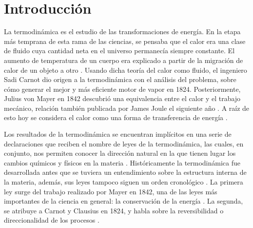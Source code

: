 
%


\newcommand{\keyword}[1]{\textit{#1}}


\chapter{Introducción}
	La termodinámica es el estudio de las transformaciones de energía. En la etapa más temprana de esta rama de las ciencias, se pensaba que el calor era una clase de fluido cuya cantidad neta en el universo permanecía siempre constante. El aumento de temperatura de un cuerpo era explicado a partir de la migración de calor de un objeto a otro \cite{feynman2011feynman, fermi1986}. Usando dicha teoría del calor como fluido, el ingeniero Sadi Carnot dio origen a la termodinámica con el análisis del problema, sobre cómo generar el mejor y más eficiente motor de vapor en 1824. Posteriormente, Julius von Mayer en 1842 descubrió una equivalencia entre el calor y el trabajo mecánico, relaci\'on también publicada por James Joule el siguiente año \cite{fermi1986}. A raíz de esto hoy se considera el calor como una forma de transferencia de energía \cite{fermi1986}.
	
	Los resultados de la termodinámica se encuentran implícitos en una serie de declaraciones que reciben el nombre de leyes de la termodinámica, las cuales, en conjunto, nos permiten conocer la dirección natural en la que tienen lugar los cambios químicos y físicos en la materia \cite{atkins2011physical}. Históricamente la termodinámica fue desarrollada antes que se tuviera un entendimiento sobre la estructura interna de la materia, además, sus leyes tampoco siguen un orden cronológico \cite{feynman2011feynman}. La primera ley surge del trabajo realizado por Mayer en 1842, una de las leyes más importantes de la ciencia en general: la conservación de la energía \cite{feynman2011feynman, fermi1986}. La segunda, se atribuye a Carnot y Clausius en 1824, y habla sobre la reversibilidad o direccionalidad de los procesos \cite{feynman2011feynman}.
	
